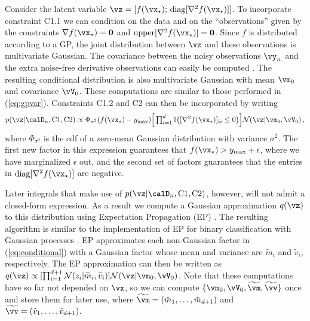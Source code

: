 \newcommand\C[1]{\mathrm{C#1}}





Consider the latent variable 
    $\vz = [f(\xopt);\, \diag[\nabla^2f(\xopt)]]$.
To incorporate constraint C1.1 we can condition on the data and on the
``observations'' given by the constraints $\nabla f(\xopt)=\zero$ and
$\upper[\nabla^2 f(\xopt)]=\zero$.  Since $f$ is distributed according to a GP,
the joint distribution between $\vz$ and these observations is multivariate
Gaussian. The covariance between the noisy observations $\vy_n$ and the extra
noise-free derivative observations can easily be computed \cite{Solak:2003}. The
resulting conditional distribution is also multivariate Gaussian with mean
$\vm_0$ and covariance $\vV_0$. These computations are similar to those
performed in (\ref{eq:gpvar}). Constraints C1.2 and C2 can then be incorporated
by writing
\begin{equation}
    \textstyle
    p(\vz|\D_n,\C1,\C2) \propto
    \Phi_{\sigma^2}(f(\xopt) - y_\text{max})
    \Big[ \prod_{i=1}^{d} \I\big([\nabla^2 f(\xopt)]_{ii} \leq 0\big) \Big]
    \Normal(\vz|\vm_0,\vV_0)\,,\label{eq:conditional}
\end{equation}
where $\Phi_{\sigma^2}$ is the cdf of a zero-mean Gaussian distribution with
variance $\sigma^2$.  The first new factor in this expression guarantees that
$f(\xopt) > y_\text{max} + \epsilon$, where we have marginalized $\epsilon$ out,
and the second set of factors guarantees that the entries in $\diag[\nabla^2
f(\xopt)]$ are negative.

Later integrals that make use of $p(\vz|\D_n,\C1,\C2)$, however, will not admit
a closed-form expression. As a result we compute a Gaussian approximation
$q(\vz)$ to this distribution using Expectation Propagation (EP)
\cite{Minka:2001}.  The resulting algorithm is similar to the implementation of
EP for binary classification with Gaussian processes \cite{Rasmussen:2006}. EP
approximates each non-Gaussian factor in (\ref{eq:conditional}) with a Gaussian
factor whose mean and variance are $\widetilde{m}_i$ and $\widetilde{v}_i$,
respectively. The EP approximation can then be written as
    $q(\vz)
    \propto [ \prod_{i=1}^{d+1} \Normal(z_i|\widetilde m_i, \widetilde v_i)
    ] \Normal(\vz|\vm_0,\vV_0)$.
Note that these computations have so far not depended on $\x$, so we can compute
$\{\vm_0,\vV_0, \widetilde\vm, \widetilde\vv\}$ once and store them for later
use, where $\widetilde\vm = (\tilde{m}_1,\ldots,\tilde{m}_{d+1})$ and
$\widetilde\vv = (\tilde{v}_1,\ldots,\tilde{v}_{d+1})$.

